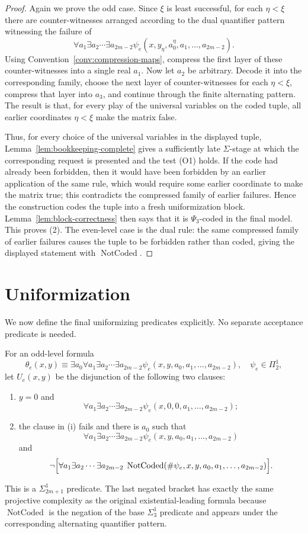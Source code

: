 \documentclass[11pt]{article}
\theoremstyle{plain}
\theoremstyle{definition}
\theoremstyle{remark}
\newcommand{\PsiThree}{\Psi_{3}}
\begin{document}
\begin{proof}
Again we prove the odd case.  Since $\xi$ is least successful, for each
$\eta<\xi$ there are counter-witnesses arranged according to the dual quantifier
pattern witnessing the failure of
\[
\forall a_1\exists a_2\cdots\exists a_{2m-2}
\psi_e(x,y_\eta,a^\eta_0,a_1,\ldots,a_{2m-2}).
\]
Using Convention~\ref{conv:compression-maps}, compress the first layer of these
counter-witnesses into a single real $a_1$.  Now let $a_2$ be arbitrary.  Decode
it into the corresponding family, choose the next layer of counter-witnesses for
each $\eta<\xi$, compress that layer into $a_3$, and continue through the
finite alternating pattern.  The result is that, for every play of the universal
variables on the coded tuple, all earlier coordinates $\eta<\xi$ make the matrix
false.

Thus, for every choice of the universal variables in the displayed tuple,
Lemma~\ref{lem:bookkeeping-complete} gives a sufficiently late $\Sigma$-stage at
which the corresponding request is presented and the test (O1) holds.  If the
code had already been forbidden, then it would have been forbidden by an earlier
application of the same rule, which would require some earlier coordinate to
make the matrix true; this contradicts the compressed family of earlier
failures.  Hence the construction codes the tuple into a fresh uniformization
block.  Lemma~\ref{lem:block-correctness} then says that it is $\PsiThree$-coded
in the final model.  This proves (2).  The even-level case is the dual rule: the
same compressed family of earlier failures causes the tuple to be forbidden
rather than coded, giving the displayed statement with $\operatorname{NotCoded}$.
\end{proof}

\section{Uniformization}\label{sec:uniformization-final}

We now define the final uniformizing predicates explicitly.  No separate
acceptance predicate is needed.

For an odd-level formula
\[
\theta_e(x,y)\equiv \exists a_0\forall a_1\exists a_2\cdots\exists a_{2m-2}
\psi_e(x,y,a_0,a_1,\ldots,a_{2m-2}),
\quad \psi_e\in\Pi^1_2,
\]
let $U_e(x,y)$ be the disjunction of the following two clauses:
\begin{enumerate}[label=(\roman*)]
\item $y=0$ and
\[
\forall a_1\exists a_2\cdots\exists a_{2m-2}
\psi_e(x,0,0,a_1,\ldots,a_{2m-2});
\]
\item the clause in (i) fails and there is $a_0$ such that
\[
\forall a_1\exists a_2\cdots\exists a_{2m-2}
\psi_e(x,y,a_0,a_1,\ldots,a_{2m-2})
\]
and
\[
\neg\Bigl[\forall a_1\exists a_2\cdots\exists a_{2m-2}\;
\operatorname{NotCoded}(\#\psi_e,x,y,a_0,a_1,\ldots,a_{2m-2})\Bigr].
\]
\end{enumerate}
This is a $\Sigma^1_{2m+1}$ predicate.  The last negated bracket has exactly the
same projective complexity as the original existential-leading formula because
$\operatorname{NotCoded}$ is the negation of the base $\Sigma^1_3$ predicate and
appears under the corresponding alternating quantifier pattern.
\end{document}
